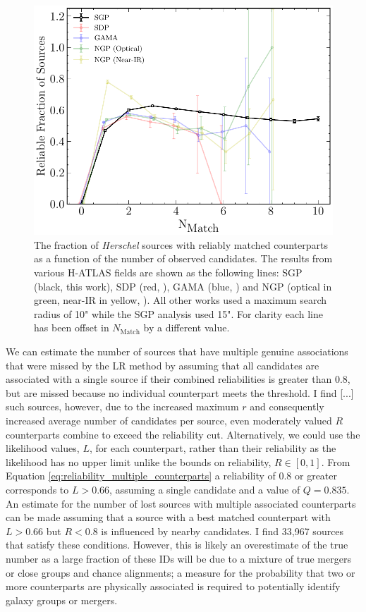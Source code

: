 \begin{figure}
    \centering
    \includegraphics[width=\columnwidth]{Figures/multiplicity.pdf}
    \caption{The fraction of \textit{Herschel} sources with reliably matched counterparts as a function of the number of observed candidates. The results from various H-ATLAS fields are shown as the following lines: SGP (black, this work), SDP (red, \citealt{Smith_2011}), GAMA (blue, \citealt{Bourne_2016}) and NGP (optical in green, near-IR in yellow, \citealt{Furlanetto_2018}). All other works used a maximum search radius of 10" while the SGP analysis used 15". For clarity each line has been offset in $N_{\textrm{Match}}$ by a different value.}
    \label{fig:multiplicity}
\end{figure}

We can estimate the number of sources that have multiple genuine associations that were missed by the LR method by assuming that all candidates are associated with a single source if their combined reliabilities is greater than 0.8, but are missed because no individual counterpart meets the threshold. I find [...] such sources, however, due to the increased maximum $r$ and consequently increased average number of candidates per source, even moderately valued $R$ counterparts combine to exceed the reliability cut. Alternatively, we could use the likelihood values, $L$, for each counterpart, rather than their reliability as the likelihood has no upper limit unlike the bounds on reliability, $R \in [0, 1]$. From Equation \ref{eq:reliability_multiple_counterparts} a reliability of 0.8 or greater corresponds to $L > 0.66$, assuming a single candidate and a value of $Q = 0.835$. An estimate for the number of lost sources with multiple associated counterparts can be made assuming that a source with a best matched counterpart with $L > 0.66$ but $R < 0.8$ is influenced by nearby candidates. I find 33,967 sources that satisfy these conditions. However, this is likely an overestimate of the true number as a large fraction of these IDs will be due to a mixture of true mergers or close groups and chance alignments; a measure for the probability that two or more counterparts are physically associated is required to potentially identify galaxy groups or mergers.


